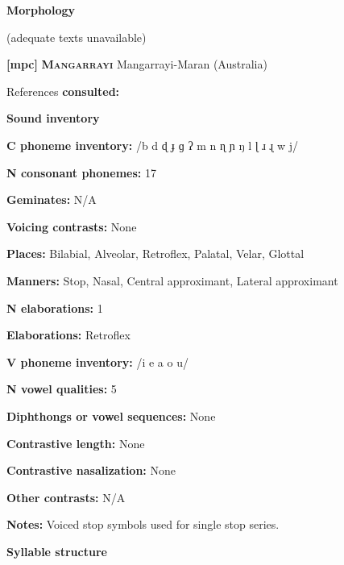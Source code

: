 \textbf{Morphology}



(adequate texts unavailable)



\textbf{[mpc]}   \textbf{\textsc{Mangarrayi}  }  Mangarrayi-Maran (Australia)



References \textbf{consulted:} \citet{Merlan1989}



\textbf{Sound inventory}



\textbf{C phoneme inventory:} /b d ɖ ɟ ɡ ʔ m n ɳ ɲ ŋ l ɭ ɹ ɻ w j/



\textbf{N consonant phonemes:} 17



\textbf{Geminates:} N/A



\textbf{Voicing contrasts:} None



\textbf{Places:} Bilabial, Alveolar, Retroflex, Palatal, Velar, Glottal



\textbf{Manners:} Stop, Nasal, Central approximant, Lateral approximant



\textbf{N elaborations:} 1



\textbf{Elaborations:} Retroflex



\textbf{V phoneme inventory:} /i e a o u/



\textbf{N vowel qualities:} 5



\textbf{Diphthongs or vowel sequences:} None



\textbf{Contrastive length:} None



\textbf{Contrastive nasalization:} None



\textbf{Other contrasts:} N/A



\textbf{Notes:} Voiced stop symbols used for single stop series.



\textbf{Syllable structure}



